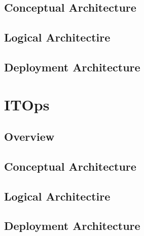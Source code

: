 \documentclass[a4paper]{book}
\begin{document}
\section{Conceptual Architecture}
\section{Logical Architectire}
\section{Deployment Architecture}

\chapter{ITOps}
\section{Overview}
\section{Conceptual Architecture}
\section{Logical Architectire}
\section{Deployment Architecture}
\end{document}
